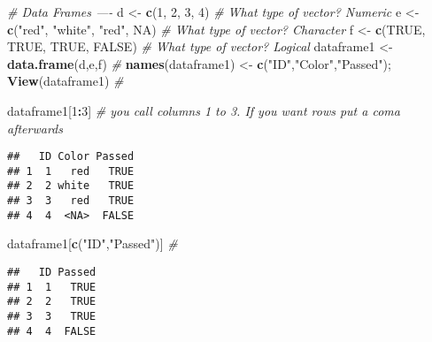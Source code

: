 \documentclass[]{article}
\newenvironment{Shaded}{\begin{snugshade}}{\end{snugshade}}
\newcommand{\KeywordTok}[1]{\textcolor[rgb]{0.13,0.29,0.53}{\textbf{#1}}}
\newcommand{\DecValTok}[1]{\textcolor[rgb]{0.00,0.00,0.81}{#1}}
\newcommand{\StringTok}[1]{\textcolor[rgb]{0.31,0.60,0.02}{#1}}
\newcommand{\CommentTok}[1]{\textcolor[rgb]{0.56,0.35,0.01}{\textit{#1}}}
\newcommand{\OtherTok}[1]{\textcolor[rgb]{0.56,0.35,0.01}{#1}}
\newcommand{\OperatorTok}[1]{\textcolor[rgb]{0.81,0.36,0.00}{\textbf{#1}}}
\newcommand{\NormalTok}[1]{#1}
\begin{document}
\begin{Shaded}
\begin{Highlighting}[]
\CommentTok{# Data Frames ----}
\NormalTok{d <-}\StringTok{ }\KeywordTok{c}\NormalTok{(}\DecValTok{1}\NormalTok{, }\DecValTok{2}\NormalTok{, }\DecValTok{3}\NormalTok{, }\DecValTok{4}\NormalTok{) }\CommentTok{# What type of vector? Numeric}
\NormalTok{e <-}\StringTok{ }\KeywordTok{c}\NormalTok{(}\StringTok{"red"}\NormalTok{, }\StringTok{"white"}\NormalTok{, }\StringTok{"red"}\NormalTok{, }\OtherTok{NA}\NormalTok{) }\CommentTok{# What type of vector? Character}
\NormalTok{f <-}\StringTok{ }\KeywordTok{c}\NormalTok{(}\OtherTok{TRUE}\NormalTok{, }\OtherTok{TRUE}\NormalTok{, }\OtherTok{TRUE}\NormalTok{, }\OtherTok{FALSE}\NormalTok{) }\CommentTok{# What type of vector? Logical}
\NormalTok{dataframe1 <-}\StringTok{ }\KeywordTok{data.frame}\NormalTok{(d,e,f) }\CommentTok{#}
\KeywordTok{names}\NormalTok{(dataframe1) <-}\StringTok{ }\KeywordTok{c}\NormalTok{(}\StringTok{"ID"}\NormalTok{,}\StringTok{"Color"}\NormalTok{,}\StringTok{"Passed"}\NormalTok{); }\KeywordTok{View}\NormalTok{(dataframe1) }\CommentTok{# }

\NormalTok{dataframe1[}\DecValTok{1}\OperatorTok{:}\DecValTok{3}\NormalTok{] }\CommentTok{# you call columns 1 to 3. If you want rows put a coma afterwards}
\end{Highlighting}
\end{Shaded}

\begin{verbatim}
##   ID Color Passed
## 1  1   red   TRUE
## 2  2 white   TRUE
## 3  3   red   TRUE
## 4  4  <NA>  FALSE
\end{verbatim}

\begin{Shaded}
\begin{Highlighting}[]
\NormalTok{dataframe1[}\KeywordTok{c}\NormalTok{(}\StringTok{"ID"}\NormalTok{,}\StringTok{"Passed"}\NormalTok{)] }\CommentTok{# }
\end{Highlighting}
\end{Shaded}

\begin{verbatim}
##   ID Passed
## 1  1   TRUE
## 2  2   TRUE
## 3  3   TRUE
## 4  4  FALSE
\end{verbatim}

\begin{Shaded}
\end{Shaded}
\end{document}
